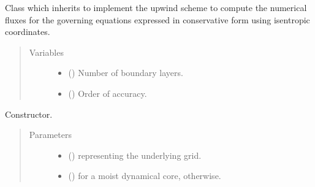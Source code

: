 \documentclass[letterpaper,10pt,english]{sphinxmanual}
\begin{document}
\begin{fulllineitems}
\label{\detokenize{api:dycore.flux_isentropic_upwind.FluxIsentropicUpwind}}
Class which inherits {\hyperref[\detokenize{api:dycore.flux_isentropic.FluxIsentropic}]{}} to implement the upwind scheme to compute
the numerical fluxes for the governing equations expressed in conservative form using isentropic coordinates.
\begin{quote}\begin{description}
\item[{Variables}] \leavevmode\begin{itemize}
\item {} 
{\hyperref[\detokenize{api:dycore.prognostic_isentropic.PrognosticIsentropic.nb}]{}} () \textendash{} Number of boundary layers.

\item {} 
 () \textendash{} Order of accuracy.

\end{itemize}

\end{description}\end{quote}

\begin{fulllineitems}
\label{\detokenize{api:dycore.flux_isentropic_upwind.FluxIsentropicUpwind.__init__}}
Constructor.
\begin{quote}\begin{description}
\item[{Parameters}] \leavevmode\begin{itemize}
\item {} 
 () \textendash{} {\hyperref[\detokenize{api:grids.grid_xyz.GridXYZ}]{}} representing the underlying grid.

\item {} 
 () \textendash{}  for a moist dynamical core,  otherwise.


\end{itemize}
\end{description}
\end{quote}
\end{fulllineitems}
\end{fulllineitems}
\end{document}
